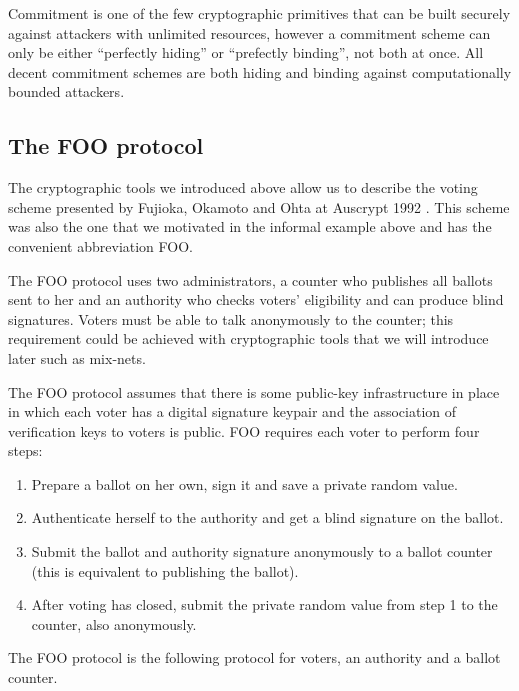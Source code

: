 \documentclass[envcountsame]{llncs}
\begin{document}
Commitment is one of the few cryptographic primitives that can be built securely
against attackers with unlimited resources, however a commitment scheme can only
be either ``perfectly hiding'' or ``prefectly binding'', not both at once.
All decent commitment schemes are both hiding and binding against
computationally bounded attackers.

\subsection{The FOO protocol}

The cryptographic tools we introduced above allow us to describe the voting
scheme presented by Fujioka, Okamoto and Ohta at Auscrypt 1992 \cite{FOO92}.
This scheme was also the one that we motivated in the informal example above and
has the convenient abbreviation FOO.

The FOO protocol uses two administrators, a counter who publishes all ballots
sent to her and an authority who checks voters' eligibility and can produce
blind signatures. Voters must be able to talk anonymously to the counter; this
requirement could be achieved with cryptographic tools that we will introduce
later such as mix-nets.

The FOO protocol assumes that there is some public-key infrastructure in place
in which each voter has a digital signature keypair and the association of
verification keys to voters is public. FOO requires each voter to perform four
steps:
\begin{enumerate}
\item Prepare a ballot on her own, sign it and save a private random value.
\item Authenticate herself to the authority and get a blind signature on the ballot.
\item Submit the ballot and authority signature anonymously to a ballot counter (this is equivalent to publishing the ballot).
\item After voting has closed, submit the private random value from step 1 to the counter, also anonymously.
\end{enumerate}

\begin{definition}
The FOO protocol is the following protocol for voters, an authority and a ballot
counter.
\end{definition}
\end{document}
